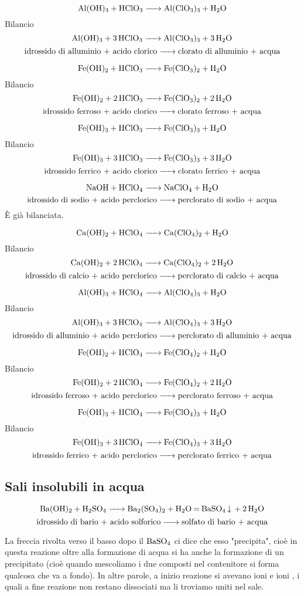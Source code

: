 $$\ce{Al(OH)_3 + HClO_3 -> Al(ClO_3)_3 + H_2O}$$Bilancio
$$\ce{Al(OH)_3 + 3 HClO_3 -> Al(ClO_3)_3 + 3 H_2O}$$
$$\text{idrossido di alluminio + acido clorico}\ce{->}\text{clorato di alluminio + acqua}$$

$$\ce{Fe(OH)_2 + HClO_3 -> Fe(ClO_3)_2 + H_2O}$$Bilancio
$$\ce{Fe(OH)_2 + 2HClO_3 -> Fe(ClO_3)_2 + 2H_2O}$$
$$\text{idrossido ferroso + acido clorico}\ce{->}\text{clorato ferroso + acqua}$$

$$\ce{Fe(OH)_3 + HClO_3 -> Fe(ClO_3)_3 + H_2O}$$Bilancio
$$\ce{Fe(OH)_3 + 3 HClO_3 -> Fe(ClO_3)_3 + 3 H_2O}$$
$$\text{idrossido ferrico + acido clorico}\ce{->}\text{clorato ferrico + acqua}$$

$$\ce{NaOH + HClO_4 -> NaClO_4 + H_2O}$$
$$\text{idrossido di sodio + acido perclorico}\ce{->}\text{perclorato di sodio + acqua}$$
È già bilanciata.

$$\ce{Ca(OH)_2 + HClO_4 -> Ca(ClO_4)_2 + H_2O}$$Bilancio
$$\ce{Ca(OH)_2 + 2 HClO_4 -> Ca(ClO_4)_2 + 2 H_2O}$$
$$\text{idrossido di calcio + acido perclorico}\ce{->}\text{perclorato di calcio + acqua}$$

$$\ce{Al(OH)_3 + HClO_4 -> Al(ClO_4)_3 + H_2O}$$Bilancio
$$\ce{Al(OH)_3 + 3 HClO_4 -> Al(ClO_4)_3 + 3 H_2O}$$
$$\text{idrossido di alluminio + acido perclorico}\ce{->}\text{perclorato di alluminio + acqua}$$

$$\ce{Fe(OH)_2 + HClO_4 -> Fe(ClO_4)_2 + H_2O}$$Bilancio
$$\ce{Fe(OH)_2 + 2 HClO_4 -> Fe(ClO_4)_2 + 2 H_2O}$$
$$\text{idrossido ferroso + acido perclorico}\ce{->}\text{perclorato ferroso + acqua}$$

$$\ce{Fe(OH)_3 + HClO_4 -> Fe(ClO_4)_3 + H_2O}$$Bilancio
$$\ce{Fe(OH)_3 + 3 HClO_4 -> Fe(ClO_4)_3 + 3 H_2O}$$
$$\text{idrossido ferrico + acido perclorico}\ce{->}\text{perclorato ferrico + acqua}$$

\subsection{Sali insolubili in acqua}
$$\ce{Ba(OH)_2 + H_2SO_4 -> Ba_2(SO_4)_2 + H_2O = BaSO_4 v + 2H_2O}$$
$$\text{idrossido di bario + acido solforico}\ce{->}\text{solfato di bario + acqua}$$

La freccia rivolta verso il basso dopo il $\rm BaSO_4$ ci dice che esso "precipita", cioè in questa reazione oltre alla formazione di acqua si ha anche la formazione di un precipitato (cioè quando mescoliamo i due composti nel contenitore si forma qualcosa che va a fondo). In altre parole, a inizio reazione si avevano ioni  e ioni , i quali a fine reazione non restano dissociati ma li troviamo uniti nel sale.

